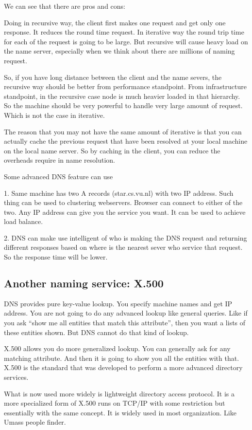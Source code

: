 \documentclass[twoside]{article}
\begin{document}
We can see that there are pros and cons:

Doing in recursive way, the client first makes one request and get only one response. It reduces the round time request. In iterative way the round trip time for each of the request is going to be large. But recursive will cause heavy load on the name server, especially when we think about there are millions of naming request.

So, if you have long distance between the client and the name severs, the recursive way should be better from performance standpoint. From infrastructure standpoint, in the recursive case node is much heavier loaded in that hierarchy. So the machine should be very powerful to handle very large amount of request. Which is not the case in iterative.

The reason that you may not have the same amount of iterative is that you can actually cache the previous request that have been resolved at your local machine on the local name server. So by caching in the client, you can reduce the overheads require in name resolution.

Some advanced DNS feature can use

1.	Same machine has two A records (star.cs.vu.nl) with two IP address. Such thing can be used to clustering webservers. Browser can connect to either of the two. Any IP address can give you the service you want. It can be used to achieve load balance.

2.	DNS can make use intelligent of who is making the DNS request and returning different responses based on where is the nearest sever who service that request. So the response time will be lower.
\subsection{Another naming service: X.500}
DNS provides pure key-value lookup. You specify machine names and get IP address. You are not going to do any advanced lookup like general queries. Like if you ask “show me all entities that match this attribute”, then you want a lists of these entities shown. But DNS cannot do that kind of lookup.

X.500 allows you do more generalized lookup. You can generally ask for any matching attribute. And then it is going to show you all the entities with that. X.500 is the standard that was developed to perform a more advanced directory services.

What is now used more widely is lightweight directory access protocol. It is a more specialized form of X.500 runs on TCP/IP with some restriction but essentially with the same concept. It is widely used in most organization. Like Umass people finder.
\end{document}
